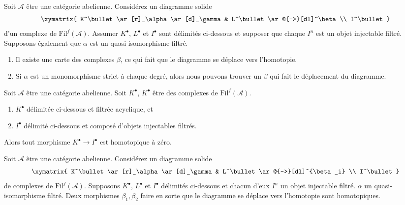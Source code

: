 \begin{exercise}
\label{exercise-morphisms-lift}
Soit $\mathcal{A}$ être une catégorie abelienne.
Considérez un diagramme solide
$$
\xymatrix{
K^\bullet \ar[r]_\alpha \ar[d]_\gamma & L^\bullet \ar@{-->}[dl]^\beta \\
I^\bullet
}
$$
d'un complexe de $\text{Fil}^f(\mathcal{A})$. Assumer $K^\bullet$, $L^\bullet$
et $I^\bullet$ sont délimités ci-dessous et supposer que
chaque $I^n$ est un objet injectable filtré.
Supposons également que $\alpha$ est un quasi-isomorphisme filtré.
\begin{enumerate}
\item Il existe une carte des complexes $\beta$, ce qui fait que le
diagramme se déplace vers l'homotopie.
\item Si $\alpha$ est un monomorphisme strict à chaque degré, alors
nous pouvons trouver un $\beta$ qui fait le déplacement du diagramme.
\end{enumerate}
\end{exercise}

\begin{exercise}
\label{exercise-acyclic-is-zero}
Soit $\mathcal{A}$ être une catégorie
abelienne. Soit $K^\bullet$, $K^\bullet$ être des complexes de
$\text{Fil}^f(\mathcal{A})$.
\begin{enumerate}
\item $K^\bullet$ délimitée ci-dessous et filtrée acyclique, et
\item $I^\bullet$ délimité ci-dessous et composé d'objets injectables filtrés.
\end{enumerate}
Alors tout morphisme $K^\bullet \to I^\bullet$ est homotopique à zéro.
\end{exercise}

\begin{exercise}
\label{exercise-morphisms-equal-up-to-homotopy}
Soit $\mathcal{A}$ être une catégorie abelienne.
Considérez un diagramme solide
$$
\xymatrix{
K^\bullet \ar[r]_\alpha \ar[d]_\gamma & L^\bullet \ar@{-->}[dl]^{\beta_i} \\
I^\bullet
}
$$
de complexes de $\text{Fil}^f(\mathcal{A})$. Supposons $K^\bullet$,
$L^\bullet$ et $I^\bullet$ délimités ci-dessous et chacun d'eux $I^n$
un objet injectable filtré.
$\alpha$ un quasi-isomorphisme filtré. Deux morphismes $\beta_1, \beta_2$
faire en sorte que le diagramme se déplace
vers l'homotopie sont homotopiques.
\end{exercise}








